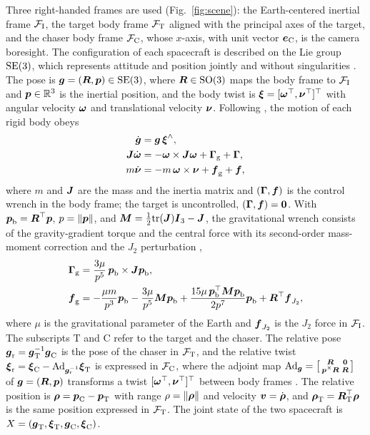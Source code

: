Three right-handed frames are used (Fig.~\ref{fig:scene}): the Earth-centered inertial frame $\mathcal{F}_{\mathrm{I}}$, the target body frame $\mathcal{F}_{\mathrm{T}}$ aligned with the principal axes of the target, and the chaser body frame $\mathcal{F}_{\mathrm{C}}$, whose $x$-axis, with unit vector $\boldsymbol{e}_{\mathrm{C}}$, is the camera boresight. The configuration of each spacecraft is described on the Lie group $\mathrm{SE}(3)$, which represents attitude and position jointly and without singularities \cite{yang2025taes,gong2026ast}. The pose is $\boldsymbol{g}=(\boldsymbol{R},\boldsymbol{p})\in\mathrm{SE}(3)$, where $\boldsymbol{R}\in\mathrm{SO}(3)$ maps the body frame to $\mathcal{F}_{\mathrm{I}}$ and $\boldsymbol{p}\in\mathbb{R}^{3}$ is the inertial position, and the body twist is $\boldsymbol{\xi}=[\boldsymbol{\omega}^{\top},\boldsymbol{\nu}^{\top}]^{\top}$ with angular velocity $\boldsymbol{\omega}$ and translational velocity $\boldsymbol{\nu}$. Following \cite{yang2025taes}, the motion of each rigid body obeys
\begin{align}
\dot{\boldsymbol{g}} &= \boldsymbol{g}\,\boldsymbol{\xi}^{\wedge}, \label{eq:kin}\\
\boldsymbol{J}\dot{\boldsymbol{\omega}} &= -\boldsymbol{\omega}\times\boldsymbol{J}\boldsymbol{\omega}+\boldsymbol{\Gamma}_{\mathrm{g}}+\boldsymbol{\Gamma}, \label{eq:rot}\\
m\dot{\boldsymbol{\nu}} &= -m\,\boldsymbol{\omega}\times\boldsymbol{\nu}+\boldsymbol{f}_{\mathrm{g}}+\boldsymbol{f}, \label{eq:trans}
\end{align}
where $m$ and $\boldsymbol{J}$ are the mass and the inertia matrix and $(\boldsymbol{\Gamma},\boldsymbol{f})$ is the control wrench in the body frame; the target is uncontrolled, $(\boldsymbol{\Gamma},\boldsymbol{f})=\boldsymbol{0}$. With $\boldsymbol{p}_{\mathrm{b}}=\boldsymbol{R}^{\top}\boldsymbol{p}$, $p=\left\lVert \boldsymbol{p} \right\rVert$, and $\boldsymbol{M}=\tfrac12\mathrm{tr}(\boldsymbol{J})\boldsymbol{I}_{3}-\boldsymbol{J}$, the gravitational wrench consists of the gravity-gradient torque and the central force with its second-order mass-moment correction and the $J_{2}$ perturbation \cite{yang2025taes,tian2024taes},
\begin{align}
\boldsymbol{\Gamma}_{\mathrm{g}} &= \frac{3\mu}{p^{5}}\,\boldsymbol{p}_{\mathrm{b}}\times\boldsymbol{J}\boldsymbol{p}_{\mathrm{b}},\label{eq:tg}\\
\boldsymbol{f}_{\mathrm{g}} &= -\frac{\mu m}{p^{3}}\boldsymbol{p}_{\mathrm{b}}-\frac{3\mu}{p^{5}}\boldsymbol{M}\boldsymbol{p}_{\mathrm{b}}+\frac{15\mu\,\boldsymbol{p}_{\mathrm{b}}^{\top}\boldsymbol{M}\boldsymbol{p}_{\mathrm{b}}}{2p^{7}}\boldsymbol{p}_{\mathrm{b}}+\boldsymbol{R}^{\top}\boldsymbol{f}_{J_{2}},\label{eq:fg}
\end{align}
where $\mu$ is the gravitational parameter of the Earth and $\boldsymbol{f}_{J_{2}}$ is the $J_{2}$ force in $\mathcal{F}_{\mathrm{I}}$. The subscripts $\mathrm{T}$ and $\mathrm{C}$ refer to the target and the chaser. The relative pose $\boldsymbol{g}_{\mathrm{r}}=\boldsymbol{g}_{\mathrm{T}}^{-1}\boldsymbol{g}_{\mathrm{C}}$ is the pose of the chaser in $\mathcal{F}_{\mathrm{T}}$, and the relative twist $\boldsymbol{\xi}_{\mathrm{r}}=\boldsymbol{\xi}_{\mathrm{C}}-\mathrm{Ad}_{\boldsymbol{g}_{\mathrm{r}}^{-1}}\boldsymbol{\xi}_{\mathrm{T}}$ is expressed in $\mathcal{F}_{\mathrm{C}}$, where the adjoint map $\mathrm{Ad}_{\boldsymbol{g}}=\bigl[\begin{smallmatrix}\boldsymbol{R}&\boldsymbol{0}\\ \boldsymbol{p}^{\times}\boldsymbol{R}&\boldsymbol{R}\end{smallmatrix}\bigr]$ of $\boldsymbol{g}=(\boldsymbol{R},\boldsymbol{p})$ transforms a twist $[\boldsymbol{\omega}^{\top},\boldsymbol{\nu}^{\top}]^{\top}$ between body frames \cite{yang2025taes}. The relative position is $\boldsymbol{\rho}=\boldsymbol{p}_{\mathrm{C}}-\boldsymbol{p}_{\mathrm{T}}$ with range $\rho=\left\lVert \boldsymbol{\rho} \right\rVert$ and velocity $\boldsymbol{v}=\dot{\boldsymbol{\rho}}$, and $\boldsymbol{\rho}_{\mathrm{T}}=\boldsymbol{R}_{\mathrm{T}}^{\top}\boldsymbol{\rho}$ is the same position expressed in $\mathcal{F}_{\mathrm{T}}$. The joint state of the two spacecraft is $X=(\boldsymbol{g}_{\mathrm{T}},\boldsymbol{\xi}_{\mathrm{T}},\boldsymbol{g}_{\mathrm{C}},\boldsymbol{\xi}_{\mathrm{C}})$.

